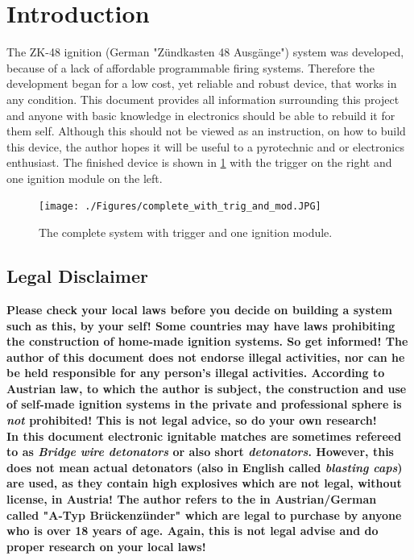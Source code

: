 
\section{Introduction}
The ZK-48 ignition (German "Zündkasten 48 Ausgänge") system was developed, because of a lack of affordable  programmable firing systems. Therefore the development began for a low cost, yet reliable and robust device, that works in any condition. This document provides all information surrounding this project and anyone with basic knowledge in electronics should be able to rebuild it for them self. Although this should not be viewed as an instruction, on how to build this device, the author hopes it will be useful to a pyrotechnic and or electronics enthusiast. The finished device is shown in \cref{fig:complete_with_trig_and_mod} with the trigger on the right and one ignition module on the left.

\begin{figure}[!ht]
    \centering
    \texttt{[image: ./Figures/complete\_with\_trig\_and\_mod.JPG]}
    \caption{The complete system with trigger and one ignition module.}
    \label{fig:complete_with_trig_and_mod}     
\end{figure}

\subsection{Legal Disclaimer}
\textbf{Please check your local laws before you decide on building a system such as this, by your self! Some countries may have laws prohibiting the construction of home-made ignition systems. So get informed! The author of this document does not endorse illegal activities, nor can he be held responsible for any person's illegal activities. According to Austrian law, to which the author is subject, the construction and use of self-made ignition systems in the private and professional sphere is \textit{not} prohibited! This is not legal advice, so do your own research!}\\

\noindent \textbf{In this document electronic ignitable matches are sometimes refereed to as \textit{Bridge wire detonators} or also short \textit{detonators}. However, this does not mean actual detonators (also in English called \textit{blasting caps}) are used, as they contain high explosives which are not legal, without license, in Austria! The author refers to the in Austrian/German called "A-Typ Brückenzünder" which are legal to purchase by anyone who is over 18 years of age. Again, this is not legal advise and do proper research on your local laws!}

